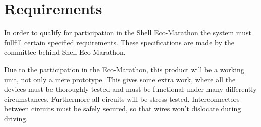 \chapter{Requirements}
In order to qualify for participation in the Shell Eco-Marathon the system must fullfill certain specified requirements. These specifications are made by the committee behind Shell Eco-Marathon. 

Due to the participation in the Eco-Marathon, this product will be a working unit, not only a mere prototype. This gives some extra work, where all the devices must be thoroughly tested and must be functional under many differently circumstances. Furthermore all circuits will be stress-tested. Interconnectors between circuits must be safely secured, so that wires won't dislocate during driving.  

%



